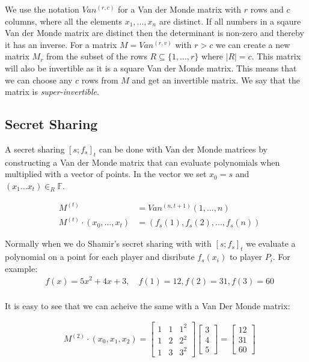 We use the notation $Van^{(r,c)}$ for a Van der Monde matrix with $r$ rows and $c$ columns, where all the elements $x_1, ... ,x_n$ are distinct. If all numbers in a sqaure Van der Monde matrix are distinct then the determinant is non-zero and thereby it has an inverse. 
For a matrix $M=Van^{(r,v)}$ with $r>c$ we can create a new matrix $M_r$ from the subset of the rows $R\subseteq\{1,...,r\}$ where $|R|=c$. This matrix will also be invertible as it is a square Van der Monde matrix. This means that we can choose any $c$ rows from $M$ and get an invertible matrix. We say that the matrix is \emph{super-invertible}.

\subsection{Secret Sharing}
A secret sharing $[s;f_s]_t$ can be done with Van der Monde matrices by constructing a Van der Monde matrix that can evaluate polynomials when multiplied with a vector of points. In the vector we set $x_0=s$ and $(x_1\dots x_t) \in_R \mathbb{F}$.

\begin{align*}
    &M^{(t)} &= Van^{(n,t+1)}(1,\dots,n) \\
    &M^{(t)} \cdot (x_0,\dots,x_t) &= (f_s(1), f_s(2), ..., f_s(n))
\end{align*}

\noindent Normally when we do Shamir's secret sharing with with $[s;f_s]_t$ we evaluate a polynomial on a point for each player and disribute $f_s(x_i)$ to player $P_i$. For example:
\begin{align*}
    &f(x) = 5x^2+4x+3, \quad f(1)=12, f(2)=31, f(3)=60 \\
\end{align*}

\noindent It is easy to see that we can acheive the same with a Van Der Monde matrix:

\begin{align*}
    &M^{(2)} \cdot (x_0, x_1,x_2) =
    \begin{bmatrix}
    1       & 1     & 1^2  \\
    1       & 2     & 2^2 \\
    1       & 3     & 3^2 
    \end{bmatrix}  
    \begin{bmatrix}
    3        \\
    4        \\
    5        
    \end{bmatrix} =
    \begin{bmatrix}
    12        \\
    31        \\
    60        
    \end{bmatrix} 
\end{align*}



